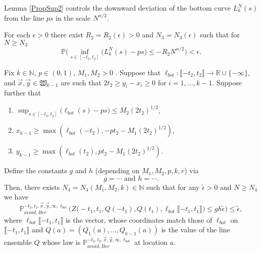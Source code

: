 Lemma \ref{PropSup2} controls the downward deviation of the bottom curve $L^N_k(s)$ from the line $ps$ in the scale $N^{\alpha/2}$.
\begin{lemma}\label{PropSup2} For each $\epsilon > 0$ there exist $R_2=R_2( \epsilon) > 0$ and $N_3=N_3(\epsilon)$ such that for $N \geq N_3$
$$\mathbb{P}\Big( \inf_{s \in [ -t_2, t_2 ]}\big(L^N_k(s) - p s \big) \leq - R_2N^{\alpha/2} \Big) < \epsilon.$$
\end{lemma}

\begin{lemma}\label{LemmaAP1} Fix $k \in \mathbb{N}$, $p \in (0,1)$, $M_1, M_2 > 0$ . Suppose that $\ell_{bot}: \llbracket -t_2, t_2 \rrbracket \rightarrow \mathbb{R} \cup \{ - \infty \}$, and $\vec{x}, \vec{y} \in \mathfrak{W}_{k-1}$ are such that $2t_2 \geq y_i-x_i \geq 0$ for $i = 1, \dots, k-1$. Suppose further that
	\begin{enumerate}
		\item $\sup_{s \in [ -t_2,t_2]}\big(\ell_{bot}(s)  - ps \big)  \leq M_2 (2t_2)^{1/2}$,
		\item  $ x_{k-1} \geq \max\left(\ell_{bot}(-t_2), -pt_2- M_1 (2t_2)^{1/2}\right),$
		\item $ y_{k-1} \geq  \max \left( \ell_{bot}(t_2),  p t_2- M_1(2t_2)^{1/2} \right).$
	\end{enumerate}
	Define the constants $g$ and $h$ (depending on $ M_1, M_2, p , k, r$) via
	$$g =  \cdots \mbox{ and } h = \cdots .$$
	Then, there exists $N_4 = N_4(M_1,M_2,k ) \in \mathbb{N}$  such that for any $\tilde{\epsilon}  > 0$ and $N \geq N_4$ we have
	\begin{equation}\label{eqn60}
	\mathbb{P}^{-t_2, t_2, \vec{x},\vec{y}, \infty, \ell_{bot} }_{avoid, Ber} \Big( Z\big(  -t_1, t_1, Q(-t_1) ,Q(t_1), \ell_{bot}\llbracket -t_1, t_1\rrbracket\big) \leq  gh \tilde{\epsilon}   \Big)  \leq \tilde{\epsilon},
	\end{equation}
	where $\ell_{bot}\llbracket -t_1, t_1\rrbracket$ is the vector, whose coordinates match those of $\ell_{bot}$ on $\llbracket -t_1, t_1\rrbracket$ and $Q(a) = (Q_1(a), \dots, Q_{k-1}(a))$ is the value of the line ensemble $Q$ whose law is $\mathbb{P}^{-t_2, t_2, \vec{x},\vec{y}, \infty, \ell_{bot} }_{avoid, Ber}$ at location $a$.
\end{lemma}


